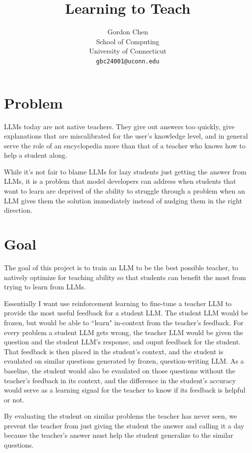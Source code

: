 \documentclass{article}
\title{Learning to Teach}
\author{
Gordon Chen\\
School of Computing\\
University of Connecticut\\
\texttt{gbc24001@uconn.edu}\\
}
\begin{document}
\maketitle

\begin{abstract}
\end{abstract}

\section{Problem}
LLMs today are not native teachers. They give out answers too quickly, give explanations that are
miscalibrated for the user's knowledge level, and in general serve the role of an encyclopedia more
than that of a teacher who knows how to help a student along.

While it's not fair to blame LLMs for lazy students just getting the answer from LLMs, it is a problem
that model developers can address when students that want to learn are deprived of the ability
to struggle through a problem when an LLM gives them the solution immediately instead of nudging them
in the right direction.

\section{Goal}
The goal of this project is to train an LLM to be the best possible teacher, to natively optimize
for teaching ability so that students can benefit the most from trying to learn from LLMs.

Essentially I want use reinforcement learning to fine-tune a teacher LLM to provide the most useful
feedback for a student LLM. The student LLM would be frozen, but would be able to ``learn" in-context from
the teacher's feedback. For every problem a student LLM gets wrong, the teacher LLM would be given
the question and the student LLM's response, and ouput feedback for the student. That feedback is then placed
in the student's context, and the student is evaulated on similar questions generated by frozen,
question-writing LLM. As a baseline, the student would also be evaulated on those questions without
the teacher's feedback in its context, and the difference in the student's accuracy would serve as a learning
signal for the teacher to know if its feedback is helpful or not.

By evaluating the student on similar problems the teacher has never seen, we prevent the teacher from just
giving the student the answer and calling it a day because the teacher's answer must help the student
generalize to the similar questions.
\end{document}
